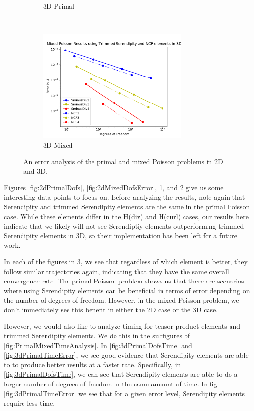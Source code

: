 \documentclass[manuscript,screen]{acmart}
\begin{document}
\begin{figure}[h!]
\begin{subfigure}[h]{0.5\textwidth}
    \caption{3D Primal}
    \label{fig:3dPrimalDofsError}
  \end{subfigure}
  ~
  \begin{subfigure}[h]{0.5\textwidth}
    \centering
    \includegraphics[height=2.2in]{3dMixedPoissonDofsError.pdf}
    \caption{3D Mixed}
    \label{fig:3dMixedDofsError}
  \end{subfigure}
  \caption{An error analysis of the primal and mixed Poisson problems in 2D and 3D.}
\label{fig:PrimalMixedErrorAnalysis}
\end{figure}


Figures \ref{fig:2dPrimalDofs}, \ref{fig:2dMixedDofsError}, \ref{fig:3dPrimalDofsError}, and \ref{fig:3dMixedDofsError} give us some interesting data points to focus on.  Before analyzing the results, note again that Serendipity and trimmed Serendipity elements are the same in the primal Poisson case.  While these elements differ in the H(div) and H(curl) cases, our results here indicate that we likely will not see Serendiptiy elements outperforming trimmed Serendipity elements in 3D, so their implementation has been left for a future work.

In each of the figures in \ref{fig:PrimalMixedErrorAnalysis}, we see that regardless of which element is better, they follow similar trajectories again, indicating that they have the same overall convergence rate.  The primal Poisson problem shows us that there are scenarios where using Serendipity elements can be beneficial in terms of error depending on the number of degrees of freedom.  However, in the mixed Poisson problem, we don't immediately see this benefit in either the 2D case or the 3D case.

However, we would also like to analyze timing for tensor product elements and trimmed Serendipity elements.  We do this in the subfigures of \ref{fig:PrimalMixedTimeAnalysis}.  In \ref{fig:3dPrimalDofsTime} and \ref{fig:3dPrimalTimeError}, we see good evidence that Serendipity elements are able to to produce better results at a faster rate.  Specifically, in \ref{fig:3dPrimalDofsTime}, we can see that Serendipity elements are able to do a larger number of degrees of freedom in the same amount of time.  In fig \ref{fig:3dPrimalTimeError} we see that for a given error level, Serendipity elements require less time.
\end{document}
